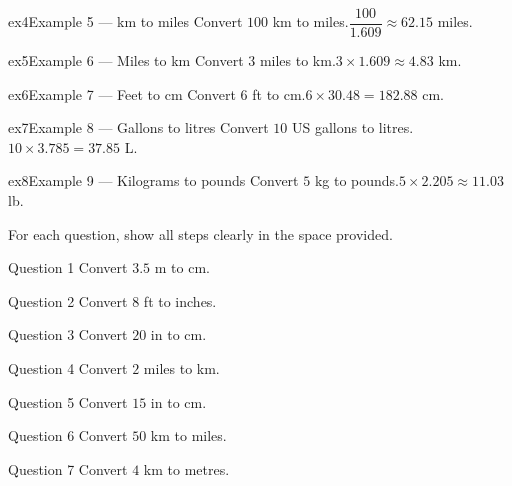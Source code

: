 \documentclass[11pt]{article}
\begin{document}
\begin{example}{ex4}{Example 5 --- km to miles}
Convert $100$ km to miles.\soln $\dfrac{100}{1.609}\approx62.15$ miles.
\end{example}

\begin{example}{ex5}{Example 6 --- Miles to km}
Convert $3$ miles to km.\soln $3\times1.609\approx4.83$ km.
\end{example}

\begin{example}{ex6}{Example 7 --- Feet to cm}
Convert $6$ ft to cm.\soln $6\times30.48=182.88$ cm.
\end{example}

\begin{example}{ex7}{Example 8 --- Gallons to litres}
Convert $10$ US gallons to litres.\soln $10\times3.785=37.85$ L.
\end{example}

\begin{example}{ex8}{Example 9 --- Kilograms to pounds}
Convert $5$ kg to pounds.\soln $5\times2.205\approx11.03$ lb.
\end{example}

\clearpage
{}
For each question, show all steps clearly in the space provided.

\begin{qbox}{Question 1}
Convert $3.5$ m to cm.\workspace{2.4cm}
\end{qbox}

\begin{qbox}{Question 2}
Convert $8$ ft to inches.\workspace{2.4cm}
\end{qbox}

\begin{qbox}{Question 3}
Convert $20$ in to cm.\workspace{2.4cm}
\end{qbox}

\begin{qbox}{Question 4}
Convert $2$ miles to km.\workspace{2.4cm}
\end{qbox}

\begin{qbox}{Question 5}
Convert $15$ in to cm.\workspace{2.4cm}
\end{qbox}

\begin{qbox}{Question 6}
Convert $50$ km to miles.\workspace{2.4cm}
\end{qbox}

\begin{qbox}{Question 7}
Convert $4$ km to metres.\workspace{2.4cm}
\end{qbox}
\end{document}
